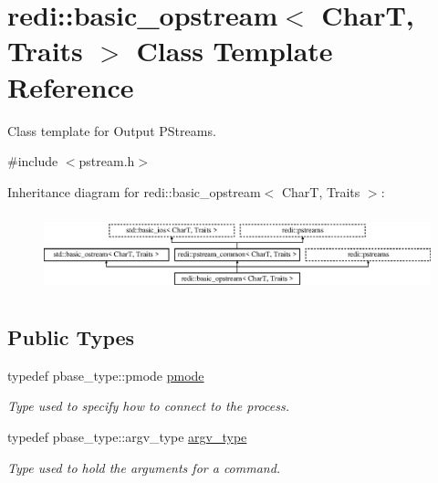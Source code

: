 \hypertarget{classredi_1_1basic__opstream}{}\section{redi\+:\+:basic\+\_\+opstream$<$ CharT, Traits $>$ Class Template Reference}
\label{classredi_1_1basic__opstream}


Class template for Output P\+Streams.  




{\ttfamily \#include $<$pstream.\+h$>$}

Inheritance diagram for redi\+:\+:basic\+\_\+opstream$<$ CharT, Traits $>$\+:\begin{figure}[H]
\begin{center}
\leavevmode
\includegraphics[height=2.295082cm]{classredi_1_1basic__opstream}
\end{center}
\end{figure}
\subsection*{Public Types}
\begin{DoxyCompactItemize}
\item 
\mbox{\label{classredi_1_1basic__opstream_a78e774284fda86b96a6c2e9b0f6f5be5}} 
typedef pbase\+\_\+type\+::pmode \mbox{\hyperlink{classredi_1_1basic__opstream_a78e774284fda86b96a6c2e9b0f6f5be5}{pmode}}
\begin{DoxyCompactList}\small\item\em Type used to specify how to connect to the process. \end{DoxyCompactList}\item 
\mbox{\label{classredi_1_1basic__opstream_a9cacf5f93ff9f77cc5121fde2d050640}} 
typedef pbase\+\_\+type\+::argv\+\_\+type \mbox{\hyperlink{classredi_1_1basic__opstream_a9cacf5f93ff9f77cc5121fde2d050640}{argv\+\_\+type}}
\begin{DoxyCompactList}\small\item\em Type used to hold the arguments for a command. \end{DoxyCompactList}\end{DoxyCompactItemize}
